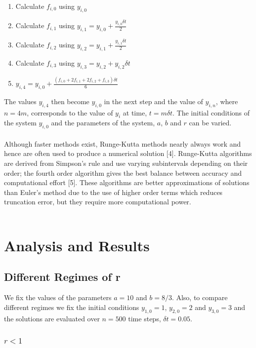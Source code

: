 \documentclass[a4paper,11pt]{article}
\begin{document}
\begin{enumerate}
\item 
Calculate $f_{i,0}$ using $y_{i,0}$ 
\item 
Calculate $f_{i,1}$ using $y_{i,1} = y_{i,0} + \frac{y_{i,0}\delta t}{2}$ 
\item 
Calculate $f_{i,2}$ using $y_{i,2} = y_{i,1} + \frac{y_{i,1}\delta t}{2}$ 
\item 
Calculate $f_{i,3}$ using $y_{i,3} = y_{i,2} + y_{i,2}\delta t$ 
\item 
$y_{i,4} = y_{i,0} + \frac{(f_{i,0}+2f_{i,1}+2f_{i,2}+f_{i,3})\delta t}{6}$ 

\end{enumerate}



The values $y_{i,4}$ then become $y_{i,0}$ in the next step and the value of $y_{i,n}$, where $n=4m$, corresponds to the value of $y_{i}$ at time, $t = m\delta t$. The initial conditions of the system $y_{i,0}$ and the parameters of the system, $a$, $b$ and $r$ can be varied.\\
\\
Although faster methods exist, Runge-Kutta methods nearly always work and hence are often used to produce a numerical solution [4]. Runge-Kutta algorithms are derived from Simpson's rule and use varying subintervals depending on their order; the fourth order algorithm gives the best balance between accuracy and computational effort  [5]. These algorithms are better approximations of solutions than Euler's method due to the use of higher order terms which reduces truncation error, but they require more computational power.\\
\\

\section{Analysis and Results}

\subsection{Different Regimes of r}

We fix the values of the parameters $a=10$ and $b=8/3$. Also, to compare different regimes we fix the initial conditions $y_{1,0}=1$, $y_{2,0}=2$ and $y_{3,0}=3$ and the solutions are evaluated over $n=500$ time steps, $\delta t=0.05$.


\subsubsection{$r<1$}
\end{document}
